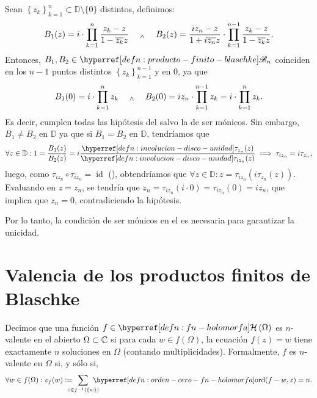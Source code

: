 \begin{ejem}
    Sean $\left\{z_k\right\}_{k=1}^n \subset \mathbb{D} \setminus \{0\}$ distintos, definimos:
    \[
    B_1(z) = i \cdot \prod_{k=1}^n \frac{z_k - z}{1 - \overline{z_k} z} \quad \; _{\wedge} \; \quad B_2(z) = \frac{iz_n - z}{1 + i \overline{z_n} z} \cdot \prod_{k=1}^{n-1} \frac{z_k - z}{1 - \overline{z_k} z}.
    \]
    Entonces, $B_1, B_2 \in \exhyperref[defn:producto-finito-blaschke]{producto-finito-blaschke}{\mathscr{B}_n}$ coinciden en los $n-1$ puntos distintos $\left\{z_k\right\}_{k=1}^{n-1}$ y en $0$, ya que
    \[
    B_1(0) = i \cdot \prod_{k=1}^n z_k  \quad \; _{\wedge} \; \quad B_2(0) = iz_n \cdot \prod_{k=1}^{n-1} z_k = i \cdot \prod_{k=1}^n z_k. 
    \]
    Es decir, cumplen todas las hipótesis del  salvo la de ser mónicos. Sin embargo, $B_1 \neq B_2$ en $\mathbb{D}$ ya que si $B_1 = B_2$ en $\mathbb{D}$, tendríamos que
    \[
    \forall z \in \mathbb{D} : 1 = \frac{B_1(z)}{B_2(z)} = i \frac{\exhyperref[defn:involucion-disco-unidad]{involucion-disco-unidad}{\tau_{z_n}}(z)}{\exhyperref[defn:involucion-disco-unidad]{involucion-disco-unidad}{\tau_{iz_n}}(z)} \implies \tau_{iz_n} = i \tau_{z_n},
    \]
    luego, como $\tau_{iz_n} \circ \tau_{i z_n} = \operatorname{id}$ (), obtendríamos que $\forall z \in \mathbb{D} : z = \tau_{iz_n} \left(i \tau_{z_n}(z)\right)$. Evaluando en $z = z_n$, se tendría que $z_n = \tau_{iz_n} \left(i \cdot 0\right) = \tau_{iz_n}(0) = iz_n$, que implica que $z_n = 0$, contradiciendo la hipótesis.

    Por lo tanto, la condición de ser mónicos en el  es necesaria para garantizar la unicidad.
\end{ejem}

\section{Valencia de los productos finitos de Blaschke}

\begin{defn}\label{defn:valencia-fn-holomorfa}
    Decimos que una función $f \in \exhyperref[defn:fn-holomorfa]{fn-holomorfa}{\mathcal{H}} \left(\Omega\right)$ es $n$-valente en el abierto $\Omega \subset \mathbb{C}$ si para cada $w \in f(\Omega)$, la ecuación $f(z) = w$ tiene exactamente $n$ soluciones en $\Omega$ (contando multiplicidades). Formalmente, $f$ es $n$-valente en $\Omega$ si, y sólo si,
    \[
    \forall w \in f(\Omega) : v_f(w) \defeq \!\!\!\!\!\! \sum_{z \in f^{-1}(\{w\})} \!\!\!\!\!\! \exhyperref[defn:orden-cero-fn-holomorfa]{orden-cero-fn-holomorfa}{\operatorname{ord}}(f-w, z) = n.
    \]
\end{defn}

